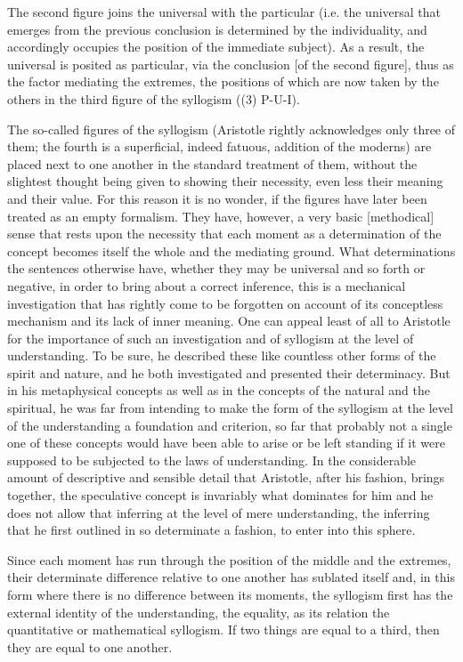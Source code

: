 The second figure joins the universal with the particular
(i.e. the universal that emerges from the previous conclusion
is determined by the individuality,
and accordingly occupies the position of the immediate subject).
As a result, the universal is posited as particular,
via the conclusion [of the second figure],
thus as the factor mediating the extremes,
the positions of which are now taken by the others
in the third figure of the syllogism
((3) P-U-I).

The so-called figures of the syllogism
(Aristotle rightly acknowledges only three of them;
the fourth is a superficial, indeed fatuous, addition of the moderns)
are placed next to one another in the standard treatment of them,
without the slightest thought being given to showing their necessity,
even less their meaning and their value.
For this reason it is no wonder,
if the figures have later been
treated as an empty formalism.
They have, however, a very basic [methodical] sense
that rests upon the necessity that each moment
as a determination of the concept
becomes itself the whole and the mediating ground.
What determinations the sentences otherwise have,
whether they may be universal and so forth or negative,
in order to bring about a correct inference,
this is a mechanical investigation that has rightly come
to be forgotten on account of its conceptless mechanism
and its lack of inner meaning.
One can appeal least of all to Aristotle
for the importance of such an investigation
and of syllogism at the level of understanding.
To be sure, he described these like countless other
forms of the spirit and nature,
and he both investigated and presented their determinacy.
But in his metaphysical concepts as well as
in the concepts of the natural and the spiritual,
he was far from intending to make the form of the syllogism
at the level of the understanding a foundation and criterion,
so far that probably not a single one of these concepts
would have been able to arise or be left standing if it were supposed
to be subjected to the laws of understanding.
In the considerable amount of descriptive and sensible detail
that Aristotle, after his fashion, brings together,
the speculative concept is invariably what dominates for him
and he does not allow that inferring at the level of mere understanding,
the inferring that he first outlined in so determinate a fashion,
to enter into this sphere.

Since each moment has run through
the position of the middle and the extremes,
their determinate difference relative to one another has sublated itself
and, in this form where there is no difference between its moments,
the syllogism first has the external identity of the understanding,
the equality, as its relation the quantitative or mathematical syllogism.
If two things are equal to a third, then they are equal to one another.

